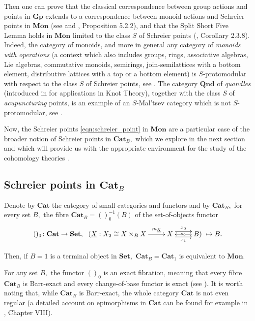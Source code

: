 \documentclass[11pt]{amsart}
\theoremstyle{plain}
\theoremstyle{definition}
\theoremstyle{remark}
\newcommand{\un}{\underline}
\begin{document}
Then one can prove that the classical correspondence between group actions and points in $\mathbf{Gp}$ extends to a correspondence between monoid actions and Schreier points in $\mathbf{Mon}$ (see \cite{MMS13} and \cite{schreier_book}, Proposition 5.2.2), and that the Split Short Five Lemma holds in $\mathbf{Mon}$ limited to the class $S$ of Schreier points (\cite{schreier_book}, Corollary 2.3.8). Indeed, the category of monoids, and more in general any category of \emph{monoids with operations} (a context which also includes groups, rings, associative algebras, Lie algebras, commutative monoids, semirings, join-semilattices with a bottom element, distributive lattices with a top or a bottom element) is $S$-protomodular with respect to the class $S$ of Schreier points, see \cite{S-protomodular}. The category $\mathbf{Qnd}$ of \emph{quandles} (introduced in \cite{joyce, matveev} for applications in Knot Theory), together with the class $S$ of \emph{acupuncturing} points, is an example of an $S$-Mal'tsev category which is not $S$-protomodular, see \cite{partial}.

Now, the Schreier points \eqref{eqn:schreier_point} in $\mathbf{Mon}$ are a particular case of the broader notion of Schreier points in $\mathbf{Cat}_B,$ which we explore in the next section and which will provide us with the appropriate environment for the study of the cohomology theories \cite{golasinski, hoff}.
\subsection{Schreier points in $\mathbf{Cat}_B$}
Denote by $\mathbf{Cat}$ the category of small categories and functors and by $\mathbf{Cat}_B,$ for every set $B,$ the fibre $\mathbf{Cat}_B=()_0^{-1}(B)$ of the set-of-objects functor
\begin{equation*}
()_0\colon\mathbf{Cat}\rightarrow\mathbf{Set}, \ \xymatrix{{(\underline{X}:X_2\cong X\times_B X} \ar[r]^-{m_{\un{X}}} &{X} \ar@<.9ex>[r]^-{x_0} \ar@<-.9ex>[r]_-{x_1} &{B)} \ar[l]|-{s_0}}\mapsto B.
\end{equation*}

Then, if $B=1$ is a terminal object in $\mathbf{Set},$ $\mathbf{Cat}_B=\mathbf{Cat}_1$ is equivalent to $\mathbf{Mon}.$

For any set $B,$ the functor $()_0$ is an exact fibration, meaning that every fibre $\mathbf{Cat}_B$ is Barr-exact and every change-of-base functor is exact (see \cite{tour}). It is worth noting that, while $\mathbf{Cat}_B$ is Barr-exact, the whole category $\mathbf{Cat}$ is not even regular (a detailed account on epimorphisms in $\mathbf{Cat}$ can be found for example in \cite{foundations}, Chapter VIII).
\end{document}
